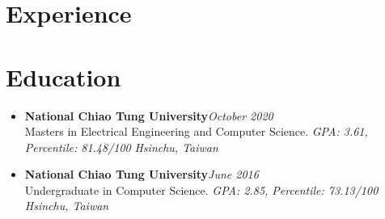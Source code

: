 \section{Experience}
\fi
\section{\sectionheading Education}

\begin{itemize}[leftmargin=0pt, label={}]%

\item{
{\sectionheading\large{\textbf{National Chiao Tung University}}}\hfill {\sectionheading\small{\textit{October 2020}}}\\
{\sectionheading\small{Masters in Electrical Engineering and Computer Science. \textit{GPA: 3.61, Percentile: 81.48/100}}}\hfill
{\sectionheading\small{\textit{Hsinchu, Taiwan}}}

}
\item{
{\sectionheading\large{\textbf{National Chiao Tung University}}}\hfill {\sectionheading\small{\textit{June 2016}}}\\
{\sectionheading\small{Undergraduate in Computer Science. \textit{GPA: 2.85, Percentile: 73.13/100}}}\hfill
{\sectionheading\small{\textit{Hsinchu, Taiwan}}}

}

\end{itemize}
